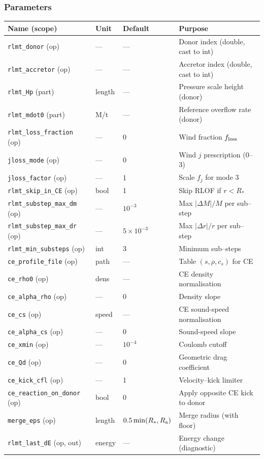 \documentclass[11pt]{article}
\begin{document}
\subsubsection{Parameters}
\begin{table}[h]
\centering\footnotesize
\begin{tabular}{@{}llll@{}}
\toprule
Name (scope) & Unit & Default & Purpose \\
\midrule
\texttt{rlmt\_donor} (op) & — & — & Donor index (double, cast to int) \\
\texttt{rlmt\_accretor} (op) & — & — & Accretor index (double, cast to int) \\
\texttt{rlmt\_Hp} (part) & length & — & Pressure scale height (donor) \\
\texttt{rlmt\_mdot0} (part) & M/t & — & Reference overflow rate (donor) \\
\texttt{rlmt\_loss\_fraction} (op) & — & 0 & Wind fraction $f_{\rm loss}$ \\
\texttt{jloss\_mode} (op) & — & 0 & Wind $j$ prescription (0–3) \\
\texttt{jloss\_factor} (op) & — & 1 & Scale $f_j$ for mode 3 \\
\texttt{rlmt\_skip\_in\_CE} (op) & bool & 1 & Skip RLOF if $r<R_\ast$ \\
\texttt{rlmt\_substep\_max\_dm} (op) & — & $10^{-3}$ & Max $|\Delta M|/M$ per sub–step \\
\texttt{rlmt\_substep\_max\_dr} (op) & — & $5\times10^{-3}$ & Max $|\Delta r|/r$ per sub–step \\
\texttt{rlmt\_min\_substeps} (op) & int & 3 & Minimum sub–steps \\
\texttt{ce\_profile\_file} (op) & path & — & Table $(s,\rho,c_s)$ for CE \\
\texttt{ce\_rho0} (op) & dens & — & CE density normalisation \\
\texttt{ce\_alpha\_rho} (op) & — & 0 & Density slope \\
\texttt{ce\_cs} (op) & speed & — & CE sound-speed normalisation \\
\texttt{ce\_alpha\_cs} (op) & — & 0 & Sound-speed slope \\
\texttt{ce\_xmin} (op) & — & $10^{-4}$ & Coulomb cutoff \\
\texttt{ce\_Qd} (op) & — & 0 & Geometric drag coefficient \\
\texttt{ce\_kick\_cfl} (op) & — & 1 & Velocity–kick limiter \\
\texttt{ce\_reaction\_on\_donor} (op) & bool & 0 & Apply opposite CE kick to donor \\
\texttt{merge\_eps} (op) & length & $0.5\min(R_\ast,R_{\rm a})$ & Merge radius (with floor) \\
\texttt{rlmt\_last\_dE} (op, out) & energy & — & Energy change (diagnostic) \\
\bottomrule
\end{tabular}
\end{table}
\end{document}
